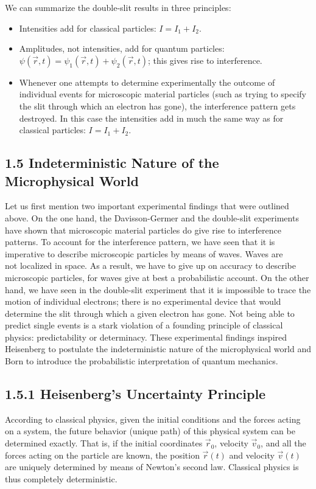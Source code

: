 \documentclass[10pt]{article}
\begin{document}
We can summarize the double-slit results in three principles:

\begin{itemize}
  \item Intensities add for classical particles: $I=I_{1}+I_{2}$.
  \item Amplitudes, not intensities, add for quantum particles: $\psi(\vec{r}, t)=\psi_{1}(\vec{r}, t)+\psi_{2}(\vec{r}, t)$; this gives rise to interference.
  \item Whenever one attempts to determine experimentally the outcome of individual events for microscopic material particles (such as trying to specify the slit through which an electron has gone), the interference pattern gets destroyed. In this case the intensities add in much the same way as for classical particles: $I=I_{1}+I_{2}$.
\end{itemize}

\subsection*{1.5 Indeterministic Nature of the Microphysical World}
Let us first mention two important experimental findings that were outlined above. On the one hand, the Davisson-Germer and the double-slit experiments have shown that microscopic material particles do give rise to interference patterns. To account for the interference pattern, we have seen that it is imperative to describe microscopic particles by means of waves. Waves are\\
not localized in space. As a result, we have to give up on accuracy to describe microscopic particles, for waves give at best a probabilistic account. On the other hand, we have seen in the double-slit experiment that it is impossible to trace the motion of individual electrons; there is no experimental device that would determine the slit through which a given electron has gone. Not being able to predict single events is a stark violation of a founding principle of classical physics: predictability or determinacy. These experimental findings inspired Heisenberg to postulate the indeterministic nature of the microphysical world and Born to introduce the probabilistic interpretation of quantum mechanics.

\subsection*{1.5.1 Heisenberg's Uncertainty Principle}
According to classical physics, given the initial conditions and the forces acting on a system, the future behavior (unique path) of this physical system can be determined exactly. That is, if the initial coordinates $\vec{r}_{0}$, velocity $\vec{v}_{0}$, and all the forces acting on the particle are known, the position $\vec{r}(t)$ and velocity $\vec{v}(t)$ are uniquely determined by means of Newton's second law. Classical physics is thus completely deterministic.
\end{document}

